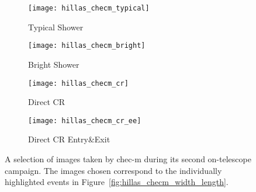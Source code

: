 \begin{sidewaysfigure}
  \begin{subfigure}[b]{0.49\textwidth}
    \texttt{[image: hillas\_checm\_typical]}
    \caption{Typical Shower}
    \label{fig:hillas_checm_typical}
  \end{subfigure}
  \hfill
  \begin{subfigure}[b]{0.49\textwidth}
    \texttt{[image: hillas\_checm\_bright]}
    \caption{Bright Shower}
    \label{fig:hillas_checm_bright}
  \end{subfigure}
   \hfill
  \begin{subfigure}[b]{0.49\textwidth}
    \texttt{[image: hillas\_checm\_cr]}
    \caption{Direct CR}
    \label{fig:hillas_checm_cr}
  \end{subfigure}
  \hfill
  \begin{subfigure}[b]{0.49\textwidth}
    \texttt{[image: hillas\_checm\_cr\_ee]}
    \caption{Direct CR Entry\&Exit}
    \label{fig:hillas_checm_cr_ee}
  \end{subfigure}
  \caption[Selection of on-sky images.]{A selection of images taken by \gls{chec-m} during its second on-telescope campaign. The images chosen correspond to the individually highlighted events in Figure~\ref{fig:hillas_checm_width_length}.}
  \label{fig:checm_cherenkov_images}
\end{sidewaysfigure}

